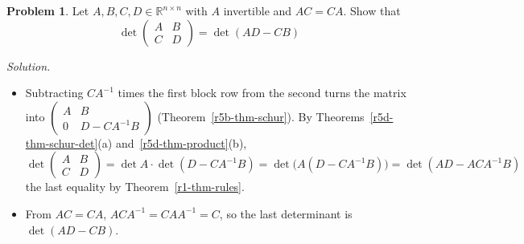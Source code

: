 \documentclass[12pt]{article}
\newcommand{\R}{\mathbb R}
\theoremstyle{definition}
\newtheorem{problem}{Problem}
\newenvironment{solution}{\par\noindent\textit{Solution.}\ }{\par\smallskip}
\begin{document}
\begin{problem}\label{r5d-pr-commuting-blocks}
Let \(A,B,C,D\in\R^{n\times n}\) with \(A\) invertible and \(AC=CA\). Show that
\[
\det\begin{pmatrix}A&B\\C&D\end{pmatrix}=\det(AD-CB)
\]
\end{problem}
\begin{solution}
\begin{itemize}
\item Subtracting \(CA^{-1}\) times the first block row from the second turns the matrix into
\(\left(\begin{smallmatrix}A&B\\0&D-CA^{-1}B\end{smallmatrix}\right)\) (Theorem~\ref{r5b-thm-schur}). By
Theorems~\ref{r5d-thm-schur-det}(a) and~\ref{r5d-thm-product}(b),
\[
\det\begin{pmatrix}A&B\\C&D\end{pmatrix}=\det A\cdot\det(D-CA^{-1}B)=\det\bigl(A(D-CA^{-1}B)\bigr)=\det(AD-ACA^{-1}B)
\]
the last equality by Theorem~\ref{r1-thm-rules}.
\item From \(AC=CA\), \(ACA^{-1}=CAA^{-1}=C\), so the last determinant is \(\det(AD-CB)\).
\end{itemize}
\end{solution}
\end{document}
